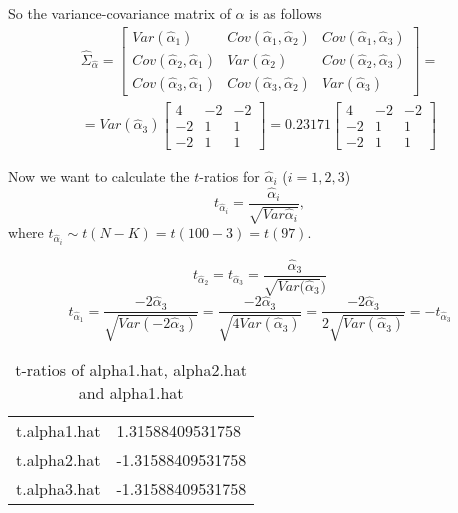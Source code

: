 \documentclass[12pt, a4paper]{article}\usepackage[]{graphicx}\usepackage[]{color}
\begin{document}
So the variance-covariance matrix of $\alpha$ is as follows
\begin{gather*}
\hat{\Sigma}_{\hat{\alpha}} = 
  \begin{bmatrix}  
      Var(\hat{\alpha}_1) & Cov(\hat{\alpha}_1,\hat{\alpha}_2) & Cov(\hat{\alpha}_1,\hat{\alpha}_3) \\ 
      Cov(\hat{\alpha}_2,\hat{\alpha}_1) & Var (\hat{\alpha}_2) & Cov(\hat{\alpha}_2,\hat{\alpha}_3) \\ 
      Cov(\hat{\alpha}_3,\hat{\alpha}_1) & Cov(\hat{\alpha}_3,\hat{\alpha}_2) & Var (\hat{\alpha}_3)
  \end{bmatrix} 
  = \\
  =
  Var(\hat{\alpha}_3)
  \begin{bmatrix}  
      4  & -2 & -2 \\
      -2 & 1  & 1 \\
      -2 & 1  & 1 
  \end{bmatrix}   
  =
  0.23171
  \begin{bmatrix}  
      4  & -2 & -2 \\
      -2 & 1  & 1 \\
      -2 & 1  & 1 
  \end{bmatrix} 
\end{gather*}


Now we want to calculate the $t$-ratios for $\hat{\alpha}_i$ ($i=1,2,3$) 
\[t_{\hat{\alpha}_i} = \frac{\hat{\alpha}_i}{\sqrt{Var\hat{\alpha}_i}}, \] 
where $t_{\hat{\alpha}_i} \sim t(N-K) = t(100-3) = t(97)$.

\[ t_{\hat{\alpha}_2} = t_{\hat{\alpha}_3} = \frac{\hat{\alpha}_3}{\sqrt{Var(\hat{\alpha}_3})} \]
\[ t_{\hat{\alpha}_1} = \frac{-2\hat{\alpha}_3}{\sqrt{Var(-2\hat{\alpha}_3)}} = \frac{-2\hat{\alpha}_3}{\sqrt{4 Var(\hat{\alpha}_3)}} = 
 \frac{-2\hat{\alpha}_3}{2 \sqrt{Var(\hat{\alpha}_3)}} = -t_{\hat{\alpha}_3} \]

\begin{table}[H]
\centering
\begin{tabular}{ll}
  \hline
  \hline
t.alpha1.hat & 1.31588409531758 \\ 
  t.alpha2.hat & -1.31588409531758 \\ 
  t.alpha3.hat & -1.31588409531758 \\ 
   \hline
\end{tabular}
\caption{t-ratios of alpha1.hat, alpha2.hat and alpha1.hat} 
\label{tab:table3}
\end{table}
\end{document}
